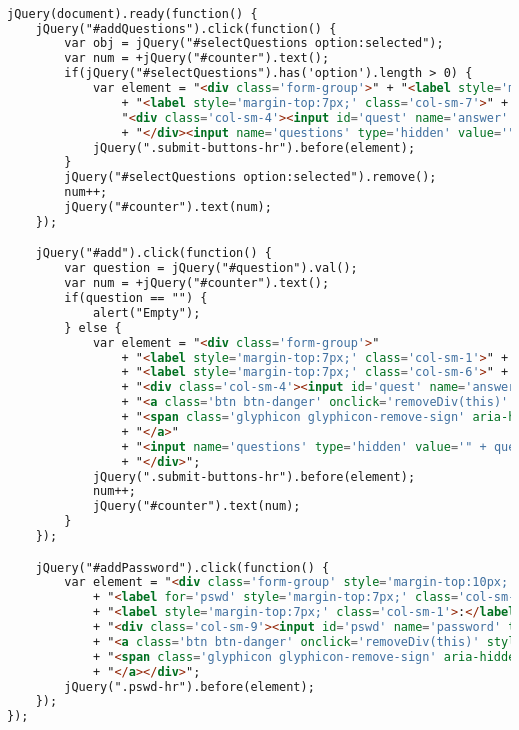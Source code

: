 \begin{lstlisting}[language=html,basicstyle=\tiny,caption=app.js]

jQuery(document).ready(function() {
    jQuery("#addQuestions").click(function() {
        var obj = jQuery("#selectQuestions option:selected");
        var num = +jQuery("#counter").text();
        if(jQuery("#selectQuestions").has('option').length > 0) {
            var element = "<div class='form-group'>" + "<label style='margin-top:7px;' class='col-sm-1'>" + num + "</label>"
                + "<label style='margin-top:7px;' class='col-sm-7'>" + obj.text() + "</label>" +
                "<div class='col-sm-4'><input id='quest' name='answer' type='text' class='form-control questions'/></div>"
                + "</div><input name='questions' type='hidden' value='" + obj.text() + "'/>";
            jQuery(".submit-buttons-hr").before(element);
        }
        jQuery("#selectQuestions option:selected").remove();
        num++;
        jQuery("#counter").text(num);
    });

    jQuery("#add").click(function() {
        var question = jQuery("#question").val();
        var num = +jQuery("#counter").text();
        if(question == "") {
            alert("Empty");
        } else {
            var element = "<div class='form-group'>"
                + "<label style='margin-top:7px;' class='col-sm-1'>" + num + "</label>"
                + "<label style='margin-top:7px;' class='col-sm-6'>" + question + "</label>"
                + "<div class='col-sm-4'><input id='quest' name='answer' type='text' class='form-control questions'/></div>"
                + "<a class='btn btn-danger' onclick='removeDiv(this)' style='margin-top:3px;'>"
                + "<span class='glyphicon glyphicon-remove-sign' aria-hidden='true'></span>"
                + "</a>"
                + "<input name='questions' type='hidden' value='" + question + "'/>"
                + "</div>";
            jQuery(".submit-buttons-hr").before(element);
            num++;
            jQuery("#counter").text(num);
        }
    });

    jQuery("#addPassword").click(function() {
        var element = "<div class='form-group' style='margin-top:10px;'>"
            + "<label for='pswd' style='margin-top:7px;' class='col-sm-1 control-label'>Password</label>"
            + "<label style='margin-top:7px;' class='col-sm-1'>:</label>"
            + "<div class='col-sm-9'><input id='pswd' name='password' type='password' class='form-control' required='required'/></div>"
            + "<a class='btn btn-danger' onclick='removeDiv(this)' style='margin-top:3px;'>"
            + "<span class='glyphicon glyphicon-remove-sign' aria-hidden='true'></span>"
            + "</a></div>";
        jQuery(".pswd-hr").before(element);
    });
});


\end{lstlisting}

